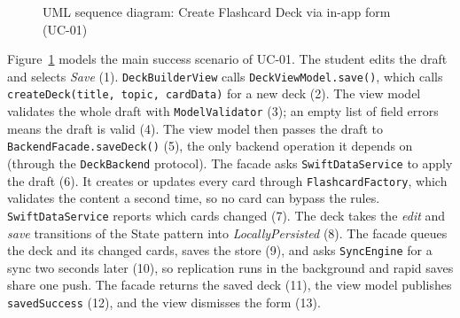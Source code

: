\documentclass[12pt,letterpaper]{article}
\begin{document}
\begin{figure}[!htbp]
{}
\caption{UML sequence diagram: Create Flashcard Deck via in-app form (UC-01)}
\label{fig:sequence}
\end{figure}

Figure~\ref{fig:sequence} models the main success scenario of UC-01. The student
edits the draft and selects \emph{Save} (1). \texttt{DeckBuilderView} calls
\texttt{DeckViewModel.save()}, which calls \texttt{createDeck(title, topic,
cardData)} for a new deck (2). The view model validates the whole draft with
\texttt{ModelValidator} (3); an empty list of field errors means the draft is valid
(4). The view model then passes the draft to \texttt{BackendFacade.saveDeck()} (5),
the only backend operation it depends on (through the \texttt{DeckBackend} protocol).
The facade asks \texttt{SwiftDataService} to apply the draft (6). It creates or
updates every card through \texttt{FlashcardFactory}, which validates the content a
second time, so no card can bypass the rules. \texttt{SwiftDataService} reports which
cards changed (7). The deck takes the \emph{edit} and \emph{save} transitions of the
State pattern into \emph{LocallyPersisted} (8). The facade queues the deck and its
changed cards, saves the store (9), and asks \texttt{SyncEngine} for a sync two
seconds later (10), so replication runs in the background and rapid saves share one
push. The facade returns the saved deck (11), the view model publishes
\texttt{savedSuccess} (12), and the view dismisses the form (13).
\end{document}
